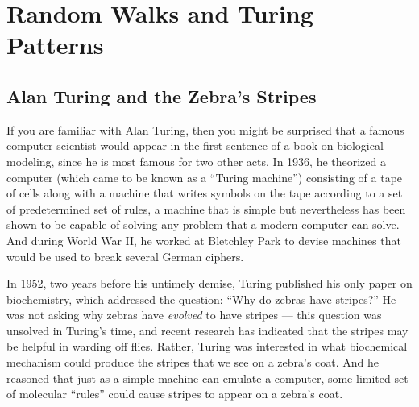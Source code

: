 \chapter[Random Walks and Turing Patterns]{Random Walks and Turing Patterns}
\label{chapter:turing}
\renewcommand{\chaptertitle}{Finding Motifs in Transcription Factor Networks}

\FloatBarrier

\section{Alan Turing and the Zebra’s Stripes}
\label{sec:introduction}

If you are familiar with Alan Turing, then you might be surprised that a famous computer scientist would appear in the first sentence of a book on biological modeling, since he is most famous for two other acts. In 1936, he theorized a computer (which came to be known as a ``Turing machine'') consisting of a tape of cells along with a machine that writes symbols on the tape according to a set of predetermined set of rules, a machine that is simple but nevertheless has been shown to be capable of solving any problem that a modern computer can solve.  And during World War II, he worked at Bletchley Park to devise machines that would be used to break several German ciphers.


In 1952, two years before his untimely demise, Turing published his only paper on biochemistry, which addressed the question: “Why do zebras have stripes?” He was not asking why zebras have \textit{evolved} to have stripes --- this question was unsolved in Turing's time, and recent research has indicated that the stripes may be helpful in warding off flies. Rather, Turing was interested in what biochemical mechanism could produce the stripes that we see on a zebra's coat. And he reasoned that just as a simple machine can emulate a computer, some limited set of molecular ``rules'' could cause stripes to appear on a zebra's coat.

